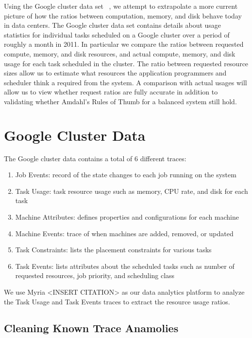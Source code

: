 \documentclass{sig-alternate}
\begin{document}
Using the Google cluster data set ~\cite{clusterdata:Wilkes2011, clusterdata:Reiss2011}, we attempt to extrapolate a more current picture of how the ratios between computation, memory, and disk behave today in data centers.
The Google cluster data set contains details about usage statistics for individual tasks scheduled on a Google cluster over a period of roughly a month in 2011.
In particular we compare the ratios between requested compute, memory, and disk resources, and actual compute, memory, and disk usage for each task scheduled in the cluster.
The ratio between requested resource sizes allow us to estimate what resources the application programmers and scheduler think a required from the system.
A comparison with actual usages will allow us to view whether request ratios are fully accurate in addition to validating whether Amdahl's Rules of Thumb for a balanced system still hold.

\section{Google Cluster Data}

The Google cluster data contains a total of 6 different traces:
\begin{enumerate}
\item Job Events: record of the state changes to each job running on the system
\item Task Usage: task resource usage such as memory, CPU rate, and disk for each task
\item Machine Attributes: defines properties and configurations for each machine
\item Machine Events: trace of when machines are added, removed, or updated
\item Task Constraints: lists the placement constraints for various tasks
\item Task Events: lists attributes about the scheduled tasks such as number of requested resources, job priority, and scheduling class
\end{enumerate}
We use Myria <INSERT CITATION> as our data analytics platform to analyze the Task Usage and Task Events traces to extract the resource usage ratios.

\subsection{Cleaning Known Trace Anamolies}
\end{document}
